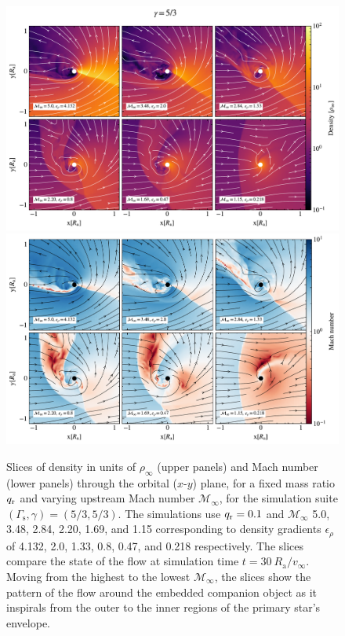 \begin{figure}[t]
\centering
\includegraphics[width=13.8cm]{figures/common_envelope/sliceplot_gamma_53_q0pt1_varymach_gradient_comparison_figure_z.pdf}
\includegraphics[width=13.8cm]{figures/common_envelope/sliceplot_gamma_53_q0pt1_varymach_mach_gradient_comparison_figure_z.pdf}
\caption{Slices of density in units of $\rho_\infty$ (upper panels) and Mach number (lower panels) through the orbital ($x$-$y$) plane, for a fixed mass ratio $q_{\rm r}$ and varying upstream Mach number $\mathcal{M}_\infty$, for the simulation suite $(\Gamma_{\mathrm s}, \gamma) = (5/3, 5/3)$. The simulations use $q_{\rm r} = 0.1$ and $\mathcal{M}_\infty$ 5.0, 3.48, 2.84, 2.20, 1.69, and 1.15 corresponding to density gradients $\epsilon_\rho$ of 4.132, 2.0, 1.33, 0.8, 0.47, and 0.218 respectively. The slices compare the state of the flow at simulation time $t = 30~R_{\mathrm{a}}/v_\infty$. Moving from the highest to the lowest $\mathcal{M}_\infty$, the slices show the pattern of the flow around the embedded companion object as it inspirals from the outer to the inner regions of the primary star's envelope. \label{fig:sims_g53_fix_q_vary_mach}}
\end{figure}

